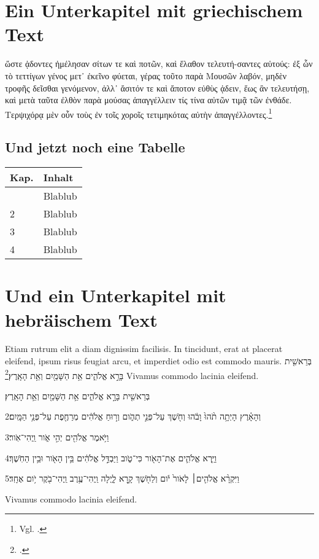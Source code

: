 \section{Ein Unterkapitel mit griechischem Text}
ὥστε ᾁδοντες ἠμέλησαν σίτων τε καὶ ποτῶν, καὶ ἔλαθον τελευτή-σαντες αὑτούς: ἐξ ὧν τὸ τεττίγων γένος μετ᾽ ἐκεῖνο φύεται, γέρας τοῦτο παρὰ Μουσῶν λαβόν, μηδὲν τροφῆς δεῖσθαι γενόμενον, ἀλλ᾽ ἄσιτόν τε καὶ ἄποτον εὐθὺς ᾁδειν, ἕως ἂν τελευτήσῃ, καὶ μετὰ ταῦτα ἐλθὸν παρὰ μούσας ἀπαγγέλλειν τίς τίνα αὐτῶν τιμᾷ τῶν ἐνθάδε. Τερψιχόρᾳ μὲν οὖν τοὺς ἐν τοῖς χοροῖς τετιμηκότας αὐτὴν ἀπαγγέλλοντες.\footnote{Vgl. .}
 \subsection{Und jetzt noch eine Tabelle}
\begin{longtable}{p{}p{}} %
	\hline
	Kap. &  Inhalt \\
	\hline
	\endhead %
	\hline
	\endfoot %
	1 & Blablub \\ %
	2 & Blablub \\
	3 & Blablub \\		
	4 & Blablub \\
\end{longtable}
\section{Und ein Unterkapitel mit hebräischem Text}
Etiam rutrum elit a diam dignissim facilisis. In tincidunt, erat at
placerat eleifend, ipsum risus feugiat arcu, et imperdiet odio est
commodo mauris. \texthebrew{בְּרֵאשִׁ֖ית בָּרָ֣א אֱלֹהִ֑ים אֵ֥ת הַשָּׁמַ֖יִם וְאֵ֥ת
  הָאָֽרֶץ׃}\footnote{.}  Vivamus commodo lacinia
eleifend.

\begin{hebrew}
בְּרֵאשִׁ֖ית בָּרָ֣א אֱלֹהִ֑ים אֵ֥ת הַשָּׁמַ֖יִם וְאֵ֥ת הָאָֽרֶץ׃

2וְהָאָ֗רֶץ הָיְתָ֥ה תֹ֨הוּ֙ וָבֹ֔הוּ וְחֹ֖שֶׁךְ עַל־פְּנֵ֣י תְהֹ֑ום וְר֣וּחַ אֱלֹהִ֔ים מְרַחֶ֖פֶת עַל־פְּנֵ֥י הַמָּֽיִם׃

3וַיֹּ֥אמֶר אֱלֹהִ֖ים יְהִ֣י אֹ֑ור וַֽיְהִי־אֹֽור׃

4וַיַּ֧רְא אֱלֹהִ֛ים אֶת־הָאֹ֖ור כִּי־טֹ֑וב וַיַּבְדֵּ֣ל אֱלֹהִ֔ים בֵּ֥ין הָאֹ֖ור וּבֵ֥ין הַחֹֽשֶׁךְ׃

5וַיִּקְרָ֨א אֱלֹהִ֤ים׀ לָאֹור֙ יֹ֔ום וְלַחֹ֖שֶׁךְ קָ֣רָא לָ֑יְלָה וַֽיְהִי־עֶ֥רֶב וַֽיְהִי־בֹ֖קֶר יֹ֥ום אֶחָֽד׃

\end{hebrew}

 Vivamus commodo lacinia eleifend.

